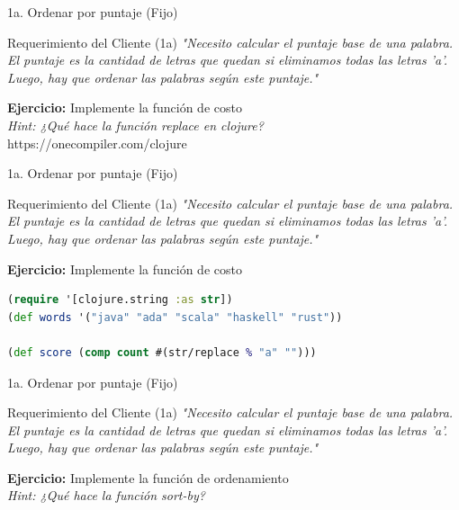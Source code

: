 \documentclass{beamer}
\begin{document}
\begin{frame}[fragile]{1a. Ordenar por puntaje (Fijo)}
    \begin{exampleblock}{Requerimiento del Cliente (1a)}
        \textit{"Necesito calcular el puntaje base de una palabra. El puntaje es la cantidad de letras que quedan si eliminamos todas las letras 'a'. Luego, hay que ordenar las palabras según este puntaje."}
    \end{exampleblock}

    \textbf{Ejercicio:} Implemente la función de costo \\
    \textit{Hint: ¿Qué hace la función replace en clojure?} \\
    https://onecompiler.com/clojure
\end{frame}

\begin{frame}[fragile]{1a. Ordenar por puntaje (Fijo)}
    \begin{exampleblock}{Requerimiento del Cliente (1a)}
        \textit{"Necesito calcular el puntaje base de una palabra. El puntaje es la cantidad de letras que quedan si eliminamos todas las letras 'a'. Luego, hay que ordenar las palabras según este puntaje."}
    \end{exampleblock}

    \textbf{Ejercicio:} Implemente la función de costo
     \begin{lstlisting}[language=Clojure]
(require '[clojure.string :as str])
(def words '("java" "ada" "scala" "haskell" "rust"))

(def score (comp count #(str/replace % "a" "")))
    \end{lstlisting}
\end{frame}


\begin{frame}[fragile]{1a. Ordenar por puntaje (Fijo)}
    \begin{exampleblock}{Requerimiento del Cliente (1a)}
        \textit{"Necesito calcular el puntaje base de una palabra. El puntaje es la cantidad de letras que quedan si eliminamos todas las letras 'a'. Luego, hay que ordenar las palabras según este puntaje."}
    \end{exampleblock}

    \textbf{Ejercicio:} Implemente la función de ordenamiento \\
    \textit{Hint: ¿Qué hace la función sort-by?}
\end{frame}
\end{document}
